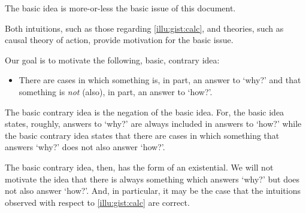 \begin{note}
  The basic idea is more-or-less the basic issue of this document.

  Both intuitions, such as those regarding \autoref{illu:gist:calc}, and theories, such as \citeauthor{Davidson:1963aa} causal theory of action, provide motivation for the basic issue.

  Our goal is to motivate the following, basic, contrary idea:

  \begin{itemize}
  \item
    There are cases in which something is, in part, an answer to `why?' and that something is \emph{not} (also), in part, an answer to `how?'.
  \end{itemize}

  The basic contrary idea is the negation of the basic idea.
  For, the basic idea states, roughly, answers to `why?' are always included in answers to `how?' while the basic contrary idea states that there are cases in which something that answers `why?' does not also answer `how?'.

  The basic contrary idea, then, has the form of an existential.
  We will not motivate the idea that there is always something which answers `why?' but does not also answer `how?'.
  And, in particular, it may be the case that the intuitions observed with respect to \autoref{illu:gist:calc} are correct.
\end{note}

